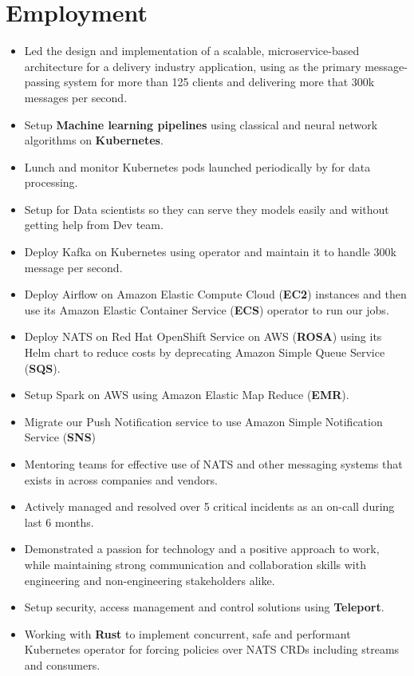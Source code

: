 \section{Employment}

\begin{itemize}
      \item Led the design and implementation of a scalable, microservice-based architecture for a delivery industry application,
            using  as the primary message-passing system for more than 125 clients and delivering
            more that 300k messages per second.
      \item Setup \textbf{Machine learning pipelines} using classical and neural network algorithms on \textbf{Kubernetes}.
      \item Lunch and monitor Kubernetes pods launched periodically by  for data processing.
      \item Setup  for Data scientists so they can serve they models easily and without getting help from Dev team.
      \item Deploy Kafka on Kubernetes using  operator and maintain it to handle 300k message per second.
      \item Deploy Airflow on Amazon Elastic Compute Cloud (\textbf{EC2}) instances and then use its Amazon Elastic Container Service (\textbf{ECS}) operator to run our jobs.
      \item Deploy NATS on Red Hat OpenShift Service on AWS (\textbf{ROSA})
            using its Helm chart to reduce costs by deprecating Amazon Simple Queue Service (\textbf{SQS}).
      \item Setup Spark on AWS using Amazon Elastic Map Reduce (\textbf{EMR}).
      \item Migrate our Push Notification service to use Amazon Simple Notification Service (\textbf{SNS})
      \item Mentoring teams for effective use of NATS and other messaging systems that exists in across companies and vendors.
      \item Actively managed and resolved over 5 critical incidents as an on-call during last 6 months.
      \item Demonstrated a passion for technology and a positive approach to work,
            while maintaining strong communication and collaboration skills with engineering
            and non-engineering stakeholders alike.
      \item Setup security, access management and control solutions using \textbf{Teleport}.
      \item Working with \textbf{Rust} to implement concurrent, safe and performant Kubernetes operator for forcing
            policies over NATS CRDs including streams and consumers.
\end{itemize}

